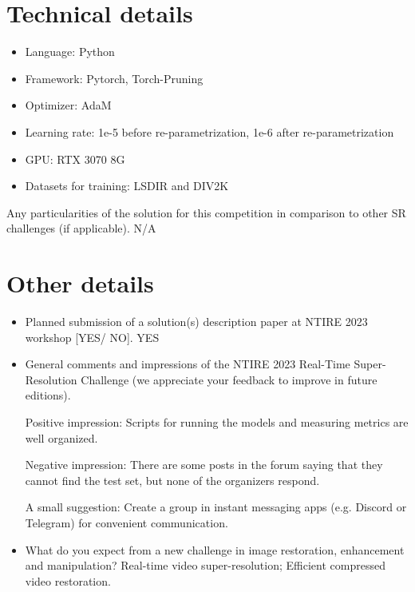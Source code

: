 \documentclass{article}
\begin{document}
\section{Technical details}
\begin{itemize}
    \item Language: Python
    \item Framework: Pytorch, Torch-Pruning\cite{fang2023depgraph}
    \item Optimizer: AdaM
    \item Learning rate: 1e-5 before re-parametrization, 1e-6 after re-parametrization
    \item GPU: RTX 3070 8G
    \item Datasets for training: LSDIR and DIV2K
\end{itemize}

\vspace{4mm}
\noindent Any particularities of the solution for this competition in comparison to other SR challenges (if applicable).
N/A

\section{Other details}
\begin{itemize}

\item Planned submission of a solution(s) description paper at NTIRE 2023 workshop [YES/ NO].
YES

\item General comments and impressions of the NTIRE 2023 Real-Time Super-Resolution Challenge (we appreciate your feedback to improve in future editions).

Positive impression: Scripts for running the models and measuring metrics are well organized.

Negative impression: There are some posts in the forum saying that they cannot find the test set, but none of the organizers respond.

A small suggestion: Create a group in instant messaging apps (e.g. Discord or Telegram) for convenient communication.

\item What do you expect from a new challenge in image restoration, enhancement and manipulation?
Real-time video super-resolution; Efficient compressed video restoration.

\end{itemize}


{\small


}
\end{document}
